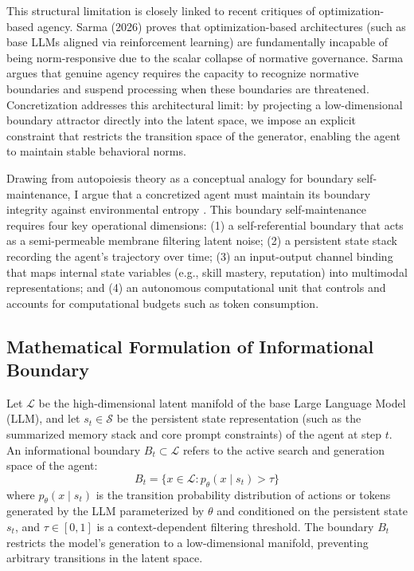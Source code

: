 \documentclass[10pt,journal,compsoc]{IEEEtran}
\begin{document}
This structural limitation is closely linked to recent critiques of optimization-based agency. Sarma (2026) \cite{sarma2026} proves that optimization-based architectures (such as base LLMs aligned via reinforcement learning) are fundamentally incapable of being norm-responsive due to the scalar collapse of normative governance. Sarma argues that genuine agency requires the capacity to recognize normative boundaries and suspend processing when these boundaries are threatened. Concretization addresses this architectural limit: by projecting a low-dimensional boundary attractor directly into the latent space, we impose an explicit constraint that restricts the transition space of the generator, enabling the agent to maintain stable behavioral norms.

Drawing from autopoiesis theory as a conceptual analogy for boundary self-maintenance, I argue that a concretized agent must maintain its boundary integrity against environmental entropy \cite{maturana1980}. This boundary self-maintenance requires four key operational dimensions: (1) a self-referential boundary that acts as a semi-permeable membrane filtering latent noise; (2) a persistent state stack recording the agent's trajectory over time; (3) an input-output channel binding that maps internal state variables (e.g., skill mastery, reputation) into multimodal representations; and (4) an autonomous computational unit that controls and accounts for computational budgets such as token consumption.

\subsection{Mathematical Formulation of Informational Boundary}
Let $\mathcal{L}$ be the high-dimensional latent manifold of the base Large Language Model (LLM), and let $s_t \in \mathcal{S}$ be the persistent state representation (such as the summarized memory stack and core prompt constraints) of the agent at step $t$. An informational boundary $B_t \subset \mathcal{L}$ refers to the active search and generation space of the agent:
\begin{equation}
B_t = \{x \in \mathcal{L} : p_\theta(x \mid s_t) > \tau\}
\end{equation}
where $p_\theta(x \mid s_t)$ is the transition probability distribution of actions or tokens generated by the LLM parameterized by $\theta$ and conditioned on the persistent state $s_t$, and $\tau \in [0, 1]$ is a context-dependent filtering threshold. The boundary $B_t$ restricts the model's generation to a low-dimensional manifold, preventing arbitrary transitions in the latent space.
\end{document}
